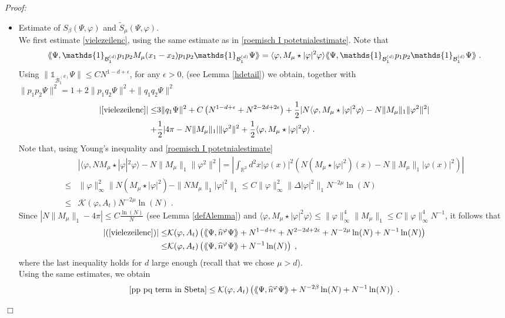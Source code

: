 \documentclass[11pt, english, american]{article}
\newcommand{\laa}{\langle\hspace{-0.08cm}\langle}
\newcommand{\raa}{\rangle\hspace{-0.08cm}\rangle}
\newenvironment{proof}{\emph{Proof:}}{\begin{flushright} $ \Box $ \end{flushright}}
\renewcommand{\phi}{\varphi}
\begin{document}
\begin{proof}
\begin{itemize}
\item Estimate of $S_\beta( \Psi, \phi)$ and $\tilde{S}_\mu( \Psi, \phi)$. \\
We first estimate \eqref{vielezeilenc}, using the same estimate as in \eqref{roemisch I potetnialestimate}.
Note that
$$
\laa\Psi ,\mathds{1}_{\mathcal{B}^{(d)}_{1}}p_1p_2M_{\mu}(x_1-x_2)p_1p_2\mathds{1}_{\mathcal{B}^{(d)}_{1}}\Psi\raa=
\langle\phi, M_{\mu} \star|\phi|^2\phi\rangle\laa\Psi ,\mathds{1}_{\mathcal{B}^{(d)}_{1}}p_1p_2\mathds{1}_{\mathcal{B}^{(d)}_{1}}\Psi\raa
\;.
$$
Using $\|\mathds{1}_{\overline{\mathcal{B}}^{(d)}_{1}} \Psi\|\leq C N^{1-d+ \epsilon}$, for any $\epsilon>0$, (see Lemma \ref{hdetail}) 
we obtain, together with $\|p_1p_2\Psi\|^2= 1+ 2 \|p_1 q_2\Psi\|^2+ \|q_1 q_2\Psi\|^2$
\begin{align*}
|\eqref{vielezeilenc}|
\leq &
3\| q_1 \Psi \|^2
+
 C
 \left(
 N^{1-d+ \epsilon}
+
N^{2-2d+ 2 \epsilon}
\right)
+
\frac{1}{2}
|N\langle\phi, M_{\mu} \star|\phi|^2\phi\rangle
- N \|M_\mu \|_1 \| \varphi^2 \|^2
|
\\
+&
\frac{1}{2}
| 4 \pi- N \|M_\mu \|_1 |\| \varphi^2 \|^2
+
\frac{1}{2}
\langle\phi, M_{\mu} \star|\phi|^2\phi\rangle
\;.
\end{align*}
Note that, using Young's inequality and
 \eqref{roemisch I potetnialestimate}
\begin{align*}
&|
\langle\phi, N M_{\mu} \star|\phi|^2\phi\rangle
- N \|M_\mu \|_1\| \varphi^2 \|^2|
=
\left|
\int_{\mathbb{R}^2} d^2 x
|\phi(x)|^2
\left(
N( M_{\mu} \star|\phi|^2)(x)
-N \|M_\mu \|_1|\phi(x)|^2
\right)
\right|
\\
\leq &
 \| \phi \|_\infty^2
 \|N(M_\mu\star|\phi|^2)-\|NM_\mu\|_1|\phi|^2\|_1
  \leq
  C
   \| \phi \|_\infty^2
   \|\Delta|\phi|^2\|_1
   N^{-2\mu} \ln(N) 
\\   
   \leq  &
   \mathcal{K}(\phi, A_t)
   N^{-2\mu} \ln(N) 
   \;.
\end{align*}
Since $|N \|M_{\mu}\|_1- 4 \pi | \leq C \frac{\ln(N)}{N} $ (see Lemma \ref{defAlemma})
and
$\langle\phi, M_{\mu} \star|\phi|^2\phi\rangle \leq \|\phi\|_\infty^4 \|M_\mu \|_1 \leq
C \|\phi\|_\infty^4 N^{-1}
 $,
it follows that
\begin{align}
\left|(\ref{vielezeilenc})\right|\leq & \mathcal{K}(\phi,A_t) \left(
\laa\Psi,\widehat{n}^{\phi}\Psi\raa+
 N^{1-d+ \epsilon}+N^{2-2d+2 \epsilon}+ 
	 	 N^{-2\mu} \ln(N) + N^{-1} \ln(N)
 \right)
 \nonumber
 \\
 \leq & \mathcal{K}(\phi,A_t)
  \left(\laa\Psi,\widehat{n}^{\phi}\Psi\raa+
 N^{-1} \ln(N)
\right)
\;,
\end{align}
where the last inequality holds for $d$ large enough (recall that we chose $\mu>d$).
\\
Using the same estimates, we obtain
\begin{align*}
\eqref{pp pq term in Sbeta}
\leq
\mathcal{K}(\phi,A_t)
 \left(\laa\Psi,\widehat{n}^{\phi}\Psi\raa+
N^{-2\beta} \ln(N) 
+
N^{-1} \ln(N) 
\right)
\;.
\end{align*}


\end{itemize}
\end{proof}
\end{document}
